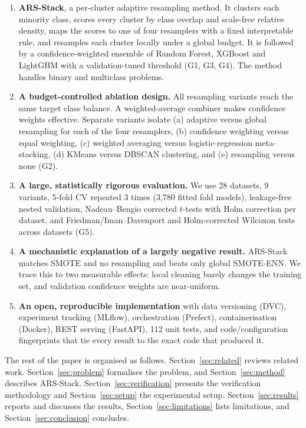 \documentclass[11pt,a4paper]{article}
\begin{document}
\begin{enumerate}
  \item[\textbf{C1}] \textbf{ARS-Stack}, a per-cluster adaptive resampling method. It clusters each minority class, scores every cluster by class overlap and scale-free relative density, maps the scores to one of four resamplers with a fixed interpretable rule, and resamples each cluster locally under a global budget. It is followed by a confidence-weighted ensemble of Random Forest, XGBoost and LightGBM with a validation-tuned threshold (G1, G3, G4). The method handles binary and multiclass problems.
  \item[\textbf{C2}] \textbf{A budget-controlled ablation design.} All resampling variants reach the same target class balance. A weighted-average combiner makes confidence weights effective. Separate variants isolate (a) adaptive versus global resampling for each of the four resamplers, (b) confidence weighting versus equal weighting, (c) weighted averaging versus logistic-regression meta-stacking, (d) KMeans versus DBSCAN clustering, and (e) resampling versus none (G2).
  \item[\textbf{C3}] \textbf{A large, statistically rigorous evaluation.} We use 28 datasets, 9 variants, 5-fold CV repeated 3 times (3{,}780 fitted fold models), leakage-free nested validation, Nadeau--Bengio corrected $t$-tests with Holm correction per dataset, and Friedman/Iman--Davenport and Holm-corrected Wilcoxon tests across datasets (G5).
  \item[\textbf{C4}] \textbf{A mechanistic explanation of a largely negative result.} ARS-Stack matches SMOTE and no resampling and beats only global SMOTE-ENN. We trace this to two measurable effects: local cleaning barely changes the training set, and validation confidence weights are near-uniform.
  \item[\textbf{C5}] \textbf{An open, reproducible implementation} with data versioning (DVC), experiment tracking (MLflow), orchestration (Prefect), containerisation (Docker), REST serving (FastAPI), 112 unit tests, and code/configuration fingerprints that tie every result to the exact code that produced it.
\end{enumerate}

The rest of the paper is organised as follows. Section~\ref{sec:related} reviews related work. Section~\ref{sec:problem} formalises the problem, and Section~\ref{sec:method} describes ARS-Stack. Section~\ref{sec:verification} presents the verification methodology and Section~\ref{sec:setup} the experimental setup. Section~\ref{sec:results} reports and discusses the results, Section~\ref{sec:limitations} lists limitations, and Section~\ref{sec:conclusion} concludes.
\end{document}
